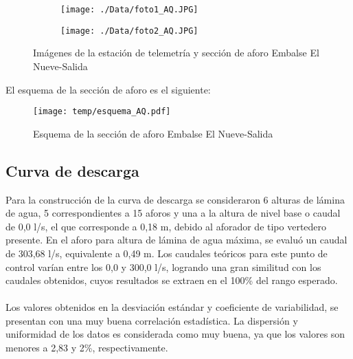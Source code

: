 \documentclass[]{article}
\begin{document}
\begin{figure}[H]
  \centering
\begin{subfigure}{.49\textwidth}
  \texttt{[image: ./Data/foto1\_AQ.JPG]}
\end{subfigure}
\hfill
\begin{subfigure}{.49\textwidth}
  \texttt{[image: ./Data/foto2\_AQ.JPG]}
\end{subfigure}
\caption{Imágenes de la estación de telemetría y sección de aforo Embalse El Nueve-Salida}
\label{fig:fotos_17}
\end{figure}

El esquema de la sección de aforo es el siguiente:

\begin{figure}[H]
  \centering
  \texttt{[image: temp/esquema\_AQ.pdf]}
\caption{Esquema de la sección de aforo Embalse El Nueve-Salida}
\label{fig:Esquema_AQ}
\end{figure}

\subsection{Curva de descarga}\label{curva-de-descarga-16}

Para la construcción de la curva de descarga se consideraron 6 alturas de lámina de agua, 5 correspondientes a 15 aforos y una a la altura de nivel base o caudal de 0,0 l/s, el que corresponde a 0,18 m, debido al aforador de tipo vertedero presente. En el aforo para altura de lámina de agua máxima, se evaluó un caudal de 303,68 l/s, equivalente a 0,49 m. Los caudales teóricos para este punto de control varían entre los 0,0 y 300,0 l/s, logrando una gran similitud con los caudales obtenidos, cuyos resultados se extraen en el 100\% del rango esperado.\\
\\
Los valores obtenidos en la desviación estándar y coeficiente de variabilidad, se presentan con una muy buena correlación estadística. La dispersión y uniformidad de los datos es considerada como muy buena, ya que los valores son menores a 2,83 y 2\%, respectivamente.
\end{document}
